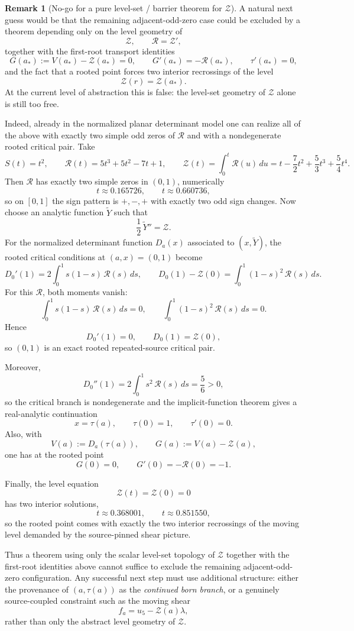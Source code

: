 \documentclass[11pt,a4paper]{amsart}
\theoremstyle{plain}
\theoremstyle{definition}
\newtheorem{remark}[theorem]{Remark}
\begin{document}
\begin{remark}[No-go for a pure level-set / barrier theorem for $\mathcal Z$]
\label{rem:no-go-pure-level-set-barrier-for-Z}
A natural next guess would be that the remaining adjacent-odd-zero case could be
excluded by a theorem depending only on the level geometry of
\[
\mathcal Z,\qquad \mathcal R=\mathcal Z',
\]
together with the first-root transport identities
\[
G(a_*):=V(a_*)-\mathcal Z(a_*)=0,
\qquad
G'(a_*)=-\mathcal R(a_*),
\qquad
\tau'(a_*)=0,
\]
and the fact that a rooted point forces two interior recrossings of the level
\[
\mathcal Z(r)=\mathcal Z(a_*).
\]
At the current level of abstraction this is false: the level-set geometry of
$\mathcal Z$ alone is still too free.

Indeed, already in the normalized planar determinant model one can realize all
of the above with exactly two simple odd zeros of $\mathcal R$ and with a
nondegenerate rooted critical pair. Take
\[
S(t)=t^2,
\qquad
\mathcal R(t)=5t^3+5t^2-7t+1,
\qquad
\mathcal Z(t)=\int_0^t \mathcal R(u)\,du
=
t-\frac72 t^2+\frac53 t^3+\frac54 t^4.
\]
Then $\mathcal R$ has exactly two simple zeros in $(0,1)$, numerically
\[
t\approx 0.165726,
\qquad
t\approx 0.660736,
\]
so on $[0,1]$ the sign pattern is $+,-,+$ with exactly two odd sign changes.
Now choose an analytic function $\widetilde Y$ such that
\[
\frac12\,\widetilde Y''=\mathcal Z.
\]
For the normalized determinant function $D_a(x)$ associated to
$(x,\widetilde Y)$, the rooted critical conditions at $(a,x)=(0,1)$ become
\[
D_0'(1)=2\int_0^1 s(1-s)\,\mathcal R(s)\,ds,
\qquad
D_0(1)-\mathcal Z(0)=\int_0^1 (1-s)^2\,\mathcal R(s)\,ds.
\]
For this $\mathcal R$, both moments vanish:
\[
\int_0^1 s(1-s)\,\mathcal R(s)\,ds=0,
\qquad
\int_0^1 (1-s)^2\,\mathcal R(s)\,ds=0.
\]
Hence
\[
D_0'(1)=0,
\qquad
D_0(1)=\mathcal Z(0),
\]
so $(0,1)$ is an exact rooted repeated-source critical pair.

Moreover,
\[
D_0''(1)=2\int_0^1 s^2\,\mathcal R(s)\,ds=\frac56>0,
\]
so the critical branch is nondegenerate and the implicit-function theorem gives
a real-analytic continuation
\[
x=\tau(a),
\qquad
\tau(0)=1,
\qquad
\tau'(0)=0.
\]
Also, with
\[
V(a):=D_a(\tau(a)),
\qquad
G(a):=V(a)-\mathcal Z(a),
\]
one has at the rooted point
\[
G(0)=0,
\qquad
G'(0)=-\mathcal R(0)=-1.
\]

Finally, the level equation
\[
\mathcal Z(t)=\mathcal Z(0)=0
\]
has two interior solutions,
\[
t\approx 0.368001,
\qquad
t\approx 0.851550,
\]
so the rooted point comes with exactly the two interior recrossings of the
moving level demanded by the source-pinned shear picture.

Thus a theorem using only the scalar level-set topology of $\mathcal Z$
together with the first-root identities above cannot suffice to exclude the
remaining adjacent-odd-zero configuration. Any successful next step must use
additional structure: either the provenance of $(a,\tau(a))$ as the
\emph{continued born branch}, or a genuinely source-coupled constraint such as
the moving shear
\[
f_a=u_5-\mathcal Z(a)\lambda,
\]
rather than only the abstract level geometry of $\mathcal Z$.
\end{remark}
\end{document}
